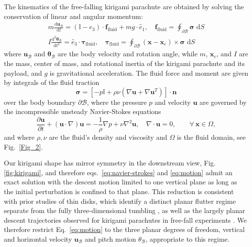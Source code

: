 \documentclass[lineno]{JFM-FLM_Au}
\begin{document}
The kinematics of the free-falling kirigami parachute are obtained by solving the conservation of linear and angular momentum:
\begin{equation}\label{eq:motion}
    \begin{split}
        m\frac{\text{d}\bm{u}_\mathcal{B}}{\text{d}t} = (\mathbb{I}-\hat{e}_3)\cdot\bm{f}_\text{fluid} + mg\cdot\hat{e}_1,\quad
        \bm{f}_\text{fluid}=\oint_{\partial\mathcal{B}}\bm \sigma\text{ d}S \\
        I\frac{\text{d}^2\bm{\theta}_\mathcal{B}}{\text{d}t^2} = \hat{e}_3\cdot\bm{\tau}_\text{fluid},\quad
        \bm{\tau}_\text{fluid}=\oint_{\partial\mathcal{B}}(\bm{x}-\bm{x}_c)\times\bm\sigma\text{ d}S
    \end{split}
\end{equation}
where $\bm{u}_\mathcal{B}$ and $\bm{\theta}_\mathcal{B}$ are the body velocity and rotation angle, while $m$, $\bm x_c$, and $I$ are the mass, center of mass, and rotational inertia of the kirigami parachute and its payload, and $g$ is gravitational acceleration.
The fluid force and moment are given by integrals of the fluid traction
\begin{equation}
    \bm\sigma = \left[-p\mathbb{I} + \rho \nu\left(\nabla\bm u + \nabla\bm u^T\right)\right]\cdot\bm{n}
\end{equation}
over the body boundary $\partial \mathcal{B}$, where the pressure $p$ and velocity $\bm u$ are governed by the incompressible unsteady Navier-Stokes equations
\begin{equation}\label{eq:navier-strokes}
     \frac{\partial\bm{u}}{\partial t} +\left(\bm{u}\cdot\nabla\right)\bm{u} = -\frac 1 \rho \nabla p + \nu\nabla^2\bm{u}, \quad
    \nabla\cdot\bm{u}=0, \quad\quad\forall\ \bm{x}\in\Omega,
\end{equation}
and where $\rho,\nu$ are the fluid's density and viscosity and $\Omega$ is the fluid domain, see Fig.~\ref{Fig_2}. 

Our kirigami shape has mirror symmetry in the downstream view, Fig.\ref{fig:kirigami}, and therefore eqs.~\ref{eq:navier-strokes} and \ref{eq:motion} admit an exact solution with the descent motion limited to one vertical plane as long as the initial perturbation is confined to that plane. This reduction is consistent with prior studies of thin disks, which identify a distinct planar flutter regime separate from the fully three-dimensional tumbling \citep{Auguste2013FallingDisks}, as well as the largely planar descent trajectories observed for kirigami parachutes in free-fall experiments \citep{Lamoureux2025Kirigami-inspiredReconfiguration}. We therefore restrict Eq.~\ref{eq:motion} to the three planar degrees of freedom, vertical and horizontal velocity $\bm u_\mathcal{B}$ and pitch motion $\theta_\mathcal{B}$, appropriate to this regime.
\end{document}
